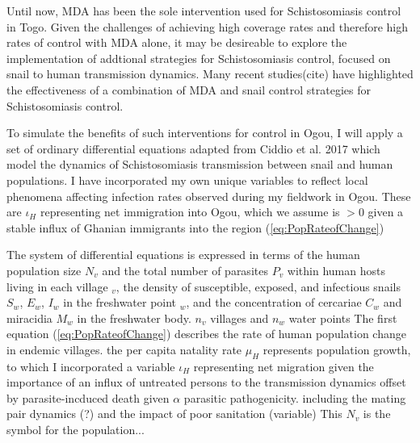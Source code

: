 \documentclass[12pt]{article}
\begin{document}


Until now, MDA has been the sole intervention used for Schistosomiasis control in Togo. Given the challenges of achieving high coverage rates and therefore high rates of control with MDA alone, it may be desireable to explore the implementation of addtional strategies for Schistosomiasis control, focused on snail to human transmission dynamics. Many recent studies(cite) have highlighted the effectiveness of a combination of MDA and snail control strategies for Schistosomiasis control. 

To simulate the benefits of such interventions for control in Ogou,  I will apply a set of ordinary differential equations adapted from Ciddio et al. 2017 which model the dynamics of Schistosomiasis transmission between snail and human populations. I have incorporated my own unique variables to reflect local phenomena affecting infection rates observed during my fieldwork in Ogou. These are $\iota_H$ representing net immigration into Ogou, which we assume is $>$0 given a stable influx of Ghanian immigrants into the region (\ref{eq:PopRateofChange}) %



The system of differential equations is expressed in terms of the human population size $N_v$ and the total number of parasites $P_v$ within human hosts living in each village $_v$, the density of susceptible, exposed, and infectious snails $S_w$, $E_w$, $I_w$ in the freshwater point $_w$, and the concentration of cercariae $C_w$ and miracidia $M_w$ in the freshwater body.
$n_v$ villages and $n_w$ water points
The first equation (\ref{eq:PopRateofChange}) describes the rate of human population change in endemic villages. the per capita natality rate $\mu_H$ represents population growth, to which I incorporated a variable $\iota_H$ representing net migration given the importance of an influx of untreated persons to the transmission dynamics
 offset by parasite-incduced death given $\alpha$ parasitic pathogenicity.
including the mating pair dynamics (?) and the impact of poor sanitation (variable)
This $N_v$ is the symbol for the population...
\end{document}
